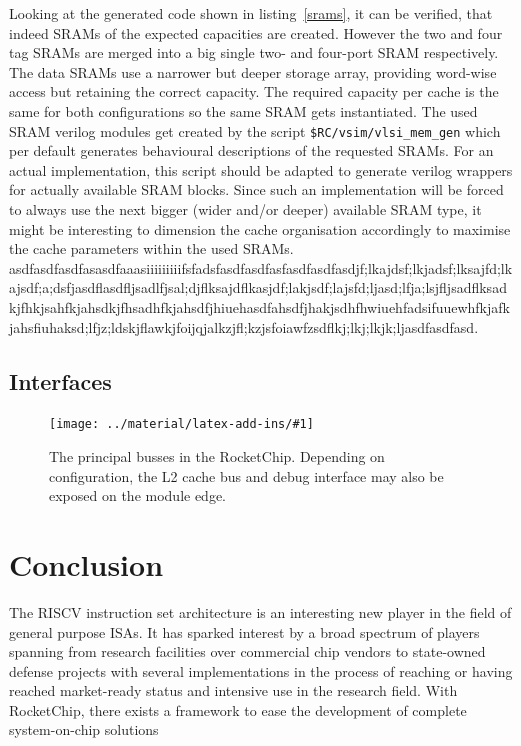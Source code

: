 \documentclass[journal,a4paper]{IEEEtran}
\newcommand*{\COMPILEIMAGES}{}%
\newcommand\inputimage[1]{%
	\ifdefined\COMPILEIMAGES
		
	\else
		\texttt{[image: ../material/latex-add-ins/\#1]}
	\fi
}
\begin{document}
Looking at the generated code shown in listing~\ref{srams}, it can be verified, that indeed SRAMs of the expected capacities are created.
However the two and four tag SRAMs are merged into a big single two- and four-port SRAM respectively.
The data SRAMs use a narrower but deeper storage array, providing word-wise access but retaining the correct capacity. The required capacity per cache is the same for both configurations so the same SRAM gets instantiated.
The used SRAM verilog modules get created by the script \texttt{\$RC/vsim/vlsi\_mem\_gen} which per default generates behavioural descriptions of the requested SRAMs.
For an actual implementation, this script should be adapted to generate verilog wrappers for actually available SRAM blocks.
Since such an implementation will be forced to always use the next bigger (wider and/or deeper) available SRAM type, it might be interesting to dimension the cache organisation accordingly to maximise the cache parameters within the used SRAMs.
asdfasdfasdfasasdfaaasiiiiiiiiifsfadsfasdfasdfasfasdfasdfasdjf;lkajdsf;lkjadsf;lksajfd;lkajsdf;a;dsfjasdflasdfljsadlfjsal;djflksajdflkasjdf;lakjsdf;lajsfd;ljasd;lfja;lsjfljsadflksadkjfhkjsahfkjahsdkjfhsadhfkjahsdfjhiuehasdfahsdfjhakjsdhfhwiuehfadsifuuewhfkjafkjahsfiuhaksd;lfjz;ldskjflawkjfoijqjalkzjfl;kzjsfoiawfzsdflkj;lkj;lkjk;ljasdfasdfasd.

\subsection{Interfaces}
\begin{figure}%
	\fourwayfalse
	\centering
	\inputimage{image4}
	\caption{The principal busses in the RocketChip. Depending on configuration, the L2 cache bus and debug interface may also be exposed on the module edge. }
	\label{asdf}
\end{figure}







\lipsum















\section{Conclusion}
The RISCV instruction set architecture is an interesting new player in the field of general purpose ISAs.
It has sparked interest by a broad spectrum of players spanning from research facilities over commercial chip vendors to state-owned defense projects with several implementations in the process of reaching or having reached market-ready status and intensive use in the research field.
With RocketChip, there exists a framework to ease the development of complete system-on-chip solutions
\end{document}
